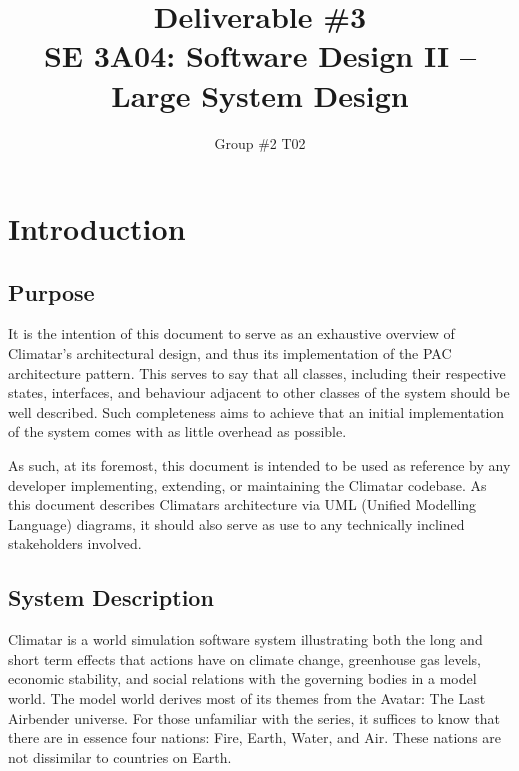 \documentclass[]{article}
\title{Deliverable \#3 \\ SE 3A04: Software Design II -- Large System Design}
\author{Group \#2 T02}
\date{}
\begin{document}
\maketitle	

\section{Introduction}
\label{sec:introduction}

\subsection{Purpose}
\label{sub:purpose}
It is the intention of this document to serve as an exhaustive overview of Climatar's architectural design, and thus its implementation of the PAC architecture pattern. This serves to say that all classes, including their respective states, interfaces, and behaviour adjacent to other classes of the system should be well described. Such completeness aims to achieve that an initial implementation of the system comes with as little overhead as possible.

\vspace{5mm}
\noindent
As such, at its foremost, this document is intended to be used as
reference by any developer implementing, extending, or maintaining the
Climatar codebase. As this document describes Climatars architecture
via UML (Unified Modelling Language) diagrams, it should also serve as
use to any technically inclined stakeholders involved.


\subsection{System Description}
\label{sub:system_description}
Climatar is a world simulation software system illustrating both the
long and short term effects that actions have on climate change,
greenhouse gas levels, economic stability, and social relations with
the governing bodies in a model world. The model world derives most of
its themes from the Avatar: The Last Airbender universe. For those
unfamiliar with the series, it suffices to know that there are in
essence four nations: Fire, Earth, Water, and Air. These nations are
not dissimilar to countries on Earth. 
\end{document}
